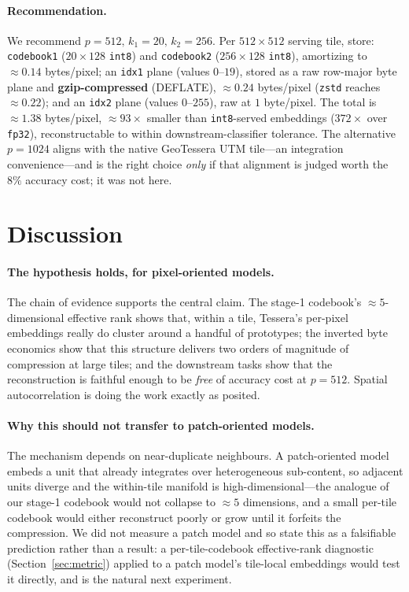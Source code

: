 \documentclass[11pt]{article}
\begin{document}
\paragraph{Recommendation.}
We recommend \textbf{$p=512,\,k_1=20,\,k_2=256$}. Per $512\times512$ serving
tile, store: \texttt{codebook1} ($20\times128$ \texttt{int8}) and
\texttt{codebook2} ($256\times128$ \texttt{int8}), amortizing to
${\approx}0.14$ bytes/pixel; an \texttt{idx1} plane (values $0$--$19$), stored as
a raw row-major byte plane and \textbf{gzip-compressed} (DEFLATE),
${\approx}0.24$ bytes/pixel (\texttt{zstd} reaches ${\approx}0.22$); and an
\texttt{idx2} plane (values $0$--$255$), raw at $1$ byte/pixel. The total is
${\approx}1.38$ bytes/pixel, ${\approx}93\times$ smaller than \texttt{int8}-served
embeddings ($372\times$ over \texttt{fp32}), reconstructable to within
downstream-classifier tolerance. The alternative $p=1024$ aligns with the native
GeoTessera UTM tile---an integration convenience---and is the right choice
\emph{only} if that alignment is judged worth the $8\%$ accuracy cost; it was not
here.

\section{Discussion}
\label{sec:discussion}

\paragraph{The hypothesis holds, for pixel-oriented models.}
The chain of evidence supports the central claim. The stage-1 codebook's
${\approx}5$-dimensional effective rank shows that, within a tile, Tessera's
per-pixel embeddings really do cluster around a handful of prototypes; the
inverted byte economics show that this structure delivers two orders of magnitude
of compression at large tiles; and the downstream tasks show that the
reconstruction is faithful enough to be \emph{free} of accuracy cost at $p=512$.
Spatial autocorrelation is doing the work exactly as posited.

\paragraph{Why this should not transfer to patch-oriented models.}
The mechanism depends on near-duplicate neighbours. A patch-oriented model
embeds a unit that already integrates over heterogeneous sub-content, so adjacent
units diverge and the within-tile manifold is high-dimensional---the analogue of
our stage-1 codebook would not collapse to ${\approx}5$ dimensions, and a small
per-tile codebook would either reconstruct poorly or grow until it forfeits the
compression. We did not measure a patch model and so state this as a falsifiable
prediction rather than a result: a per-tile-codebook effective-rank diagnostic
(Section~\ref{sec:metric}) applied to a patch model's tile-local embeddings would
test it directly, and is the natural next experiment.
\end{document}
